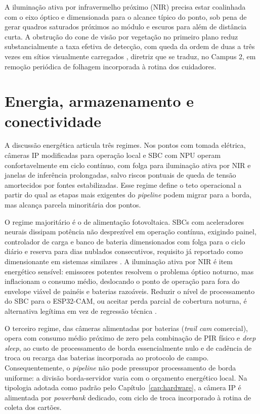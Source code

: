 A iluminação ativa por infravermelho próximo (NIR) precisa estar coalinhada com o eixo óptico e dimensionada para o alcance típico do ponto, sob pena de gerar quadros saturados próximos ao módulo e escuros para além de distância curta. A obstrução do cone de visão por vegetação no primeiro plano reduz substancialmente a taxa efetiva de detecção, com queda da ordem de duas a três vezes em sítios visualmente carregados \cite{moll2020viewshed}, diretriz que se traduz, no Campus 2, em remoção periódica de folhagem incorporada à rotina dos cuidadores.


\section{Energia, armazenamento e conectividade}
\label{sec:ap-hw-energia}


A discussão energética articula três regimes. Nos pontos com tomada elétrica, câmeras IP modificadas para operação local e SBC com NPU operam confortavelmente em ciclo contínuo, com folga para iluminação ativa por NIR e janelas de inferência prolongadas, salvo riscos pontuais de queda de tensão amortecidos por fontes estabilizadas. Esse regime define o teto operacional a partir do qual as etapas mais exigentes do \textit{pipeline} podem migrar para a borda, mas alcança parcela minoritária dos pontos.


O regime majoritário é o de alimentação fotovoltaica. SBCs com aceleradores neurais dissipam potência não desprezível em operação contínua, exigindo painel, controlador de carga e banco de bateria dimensionados com folga para o ciclo diário e reserva para dias nublados consecutivos, requisito já reportado como dimensionante em sistemas similares \cite{velasco2024smartcameratraps,pishdast2025smartcameratraps,sargent2021raspberrypi}. A iluminação ativa por NIR é item energético sensível: emissores potentes resolvem o problema óptico noturno, mas inflacionam o consumo médio, deslocando o ponto de operação para fora do envelope viável de painéis e baterias razoáveis. Reduzir o nível de processamento do SBC para o ESP32-CAM, ou aceitar perda parcial de cobertura noturna, é alternativa legítima em vez de regressão técnica \cite{tiddeman2023lowpowerhardware}.


O terceiro regime, das câmeras alimentadas por baterias (\textit{trail cam} comercial), opera com consumo médio próximo de zero pela combinação de PIR físico e \textit{deep sleep}, ao custo de processamento de borda essencialmente nulo e de cadência de troca ou recarga das baterias incorporada ao protocolo de campo. Consequentemente, o \textit{pipeline} não pode pressupor processamento de borda uniforme: a divisão borda-servidor varia com o orçamento energético local. Na tipologia adotada como padrão pelo Capítulo~\ref{cap:hardware}, a câmera IP é alimentada por \textit{powerbank} dedicado, com ciclo de troca incorporado à rotina de coleta dos cartões.


